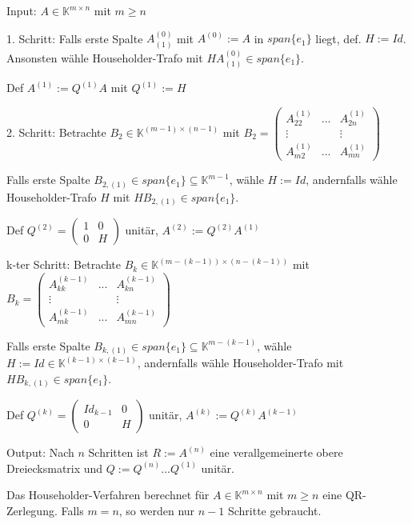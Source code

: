 \begin{algorithm}
	Input: $A \in \mathbb{K}^{m\times n}$ mit $m \geq n$
	
	1. Schritt: Falls erste Spalte $A_{(1)}^(0)$ mit $A^{(0)} := A$ in $span\{e_1\}$ liegt, def. $H:=Id$. Ansonsten wähle Householder-Trafo mit $HA_{(1)}^{(0)} \in span\{e_1\}$.
	
	Def $A^{(1)} := Q^{(1)} A$ mit $Q^{(1)} := H$
	
	2. Schritt: Betrachte $B_2 \in \mathbb{K}^{(m-1)\times (n-1)}$ mit $B_2 = \left(\begin{matrix}
		A_{22}^{(1)} & ... & A_{2n}^{(1)}\\
		\vdots & & \vdots\\
		A_{m2}^{(1)} & ... & A_{mn}^{(1)}
	\end{matrix}\right)$
	
	Falls erste Spalte $B_{2,(1)} \in span\{e_1\} \subseteq \mathbb{K}^{m-1}$, wähle $H:=Id$, andernfalls wähle Householder-Trafo $H$ mit $HB_{2,(1)} \in span\{e_1\}$.
	
	Def $Q^{(2)} = \left(\begin{matrix}
		1 & 0\\
		0 & H
	\end{matrix}\right)$ unitär, $A^{(2)} := Q^{(2)}A^{(1)}$
	
	k-ter Schritt: Betrachte $B_k \in \mathbb{K}^{(m-(k-1))\times (n-(k-1))}$ mit $B_k = \left(\begin{matrix}
		A_{kk}^{(k-1)} & ... & A_{kn}^{(k-1)}\\
		\vdots & & \vdots\\
		A_{mk}^{(k-1)} & ... & A_{mn}^{(k-1)}
	\end{matrix}\right)$
	
	Falls erste Spalte $B_{k,(1)} \in span\{e_1\} \subseteq \mathbb{K}^{m-(k-1)}$, wähle $H:=Id \in \mathbb{K}^{(k-1)\times (k-1)}$, andernfalls wähle Householder-Trafo mit $HB_{k,(1)} \in span\{e_1\}$.
	
	Def $Q^{(k)} = \left(\begin{matrix}
		Id_{k-1} & 0\\
		0 & H
	\end{matrix}\right)$ unitär, $A^{(k)} := Q^{(k)}A^{(k-1)}$
	
	Output: Nach $n$ Schritten ist $R:=A^{(n)}$ eine verallgemeinerte obere Dreiecksmatrix und $Q:=Q^{(n)}...Q^{(1)}$ unitär.
\end{algorithm}

\begin{theorem}
	Das Householder-Verfahren berechnet für $A \in \mathbb{K}^{m\times n}$ mit $m \geq n$ eine QR-Zerlegung. Falls $m = n$, so werden nur $n-1$ Schritte gebraucht.
\end{theorem}

